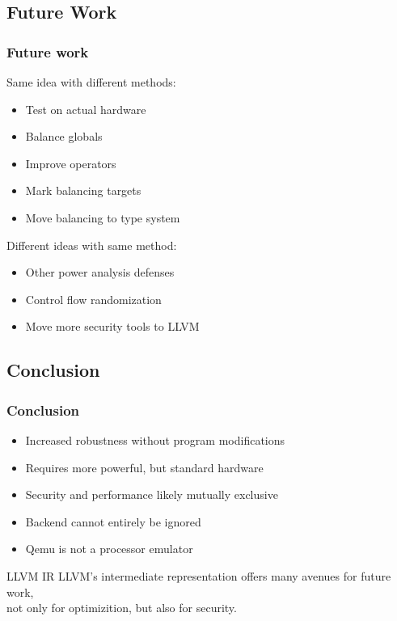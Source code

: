 \documentclass[11pt,t,usepdftitle=false,aspectratio=169]{beamer}
\begin{document}
\subsection{Future Work}
\begin{frame}
  \frametitle{Future work}
  Same idea with different methods:
  \begin{itemize}
  \item Test on actual hardware
  \item Balance globals
  \item Improve operators
  \item Mark balancing targets
  \item Move balancing to type system
  \end{itemize}
  \vspace{0.5cm}
  Different ideas with same method:
  \begin{itemize}
  \item Other power analysis defenses
  \item Control flow randomization
  \item Move more security tools to LLVM
  \end{itemize}
\end{frame}

\subsection{Conclusion}
\begin{frame}
  \frametitle{Conclusion}
  \begin{itemize}
  \item Increased robustness without program modifications
  \item Requires more powerful, but standard hardware
  \item Security and performance likely mutually exclusive
  \item Backend cannot entirely be ignored
  \item Qemu is not a processor emulator
  \end{itemize}
  \vfill
  \begin{block}{LLVM IR}
    LLVM's intermediate representation offers many avenues for future work,\\
    not only for optimizition, but also for security.
  \end{block}
\end{frame}
\end{document}
